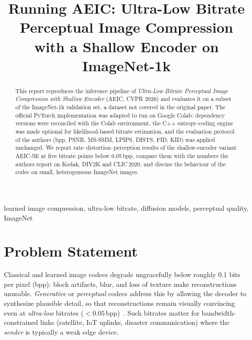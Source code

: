 \documentclass[conference]{IEEEtran}
\begin{document}
\title{Running AEIC: Ultra-Low Bitrate Perceptual Image Compression with a Shallow Encoder on ImageNet-1k}

\author{
\and
{}
}

\maketitle

\begin{abstract}
This report reproduces the inference pipeline of \emph{Ultra-Low Bitrate Perceptual Image
Compression with Shallow Encoder} (AEIC, CVPR 2026) and evaluates it on a subset of the
ImageNet-1k validation set, a dataset not covered in the original paper. The official PyTorch
implementation was adapted to run on Google Colab: dependency versions were reconciled with the
Colab environment, the C++ entropy-coding engine was made optional for likelihood-based bitrate
estimation, and the evaluation protocol of the authors (bpp, PSNR, MS-SSIM, LPIPS, DISTS, FID,
KID) was applied unchanged. We report rate--distortion--perception results of the shallow-encoder
variant AEIC-SE at five bitrate points below 0.05\,bpp, compare them with the numbers the authors
report on Kodak, DIV2K and CLIC\,2020, and discuss the behaviour of the codec on small,
heterogeneous ImageNet images.
\end{abstract}

\begin{IEEEkeywords}
learned image compression, ultra-low bitrate, diffusion models, perceptual quality, ImageNet
\end{IEEEkeywords}

\section{Problem Statement}
Classical and learned image codecs degrade ungracefully below roughly 0.1 bits per pixel (bpp):
block artifacts, blur, and loss of texture make reconstructions unusable. \emph{Generative} or
\emph{perceptual} codecs address this by allowing the decoder to synthesize plausible detail, so
that reconstructions remain visually convincing even at \emph{ultra-low} bitrates
($<0.05$\,bpp)~\cite{aeic}. Such bitrates matter for bandwidth-constrained links (satellite,
IoT uplinks, disaster communication) where the \emph{sender} is typically a weak edge device.
\end{document}
